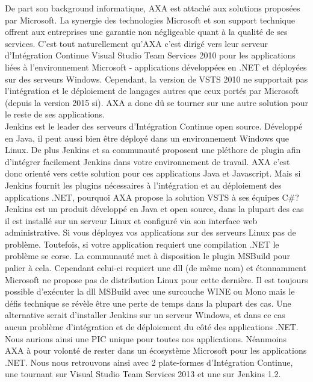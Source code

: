     De part son background informatique, AXA est attaché aux solutions proposées par Microsoft. La synergie des technologies Microsoft et son support technique offrent aux entreprises une garantie non négligeable quant à la qualité de ses services. C'est tout naturellement qu'AXA c'est dirigé vers leur serveur d'Intégration Continue Visual Studio Team Services 2010 pour les applications liées à l'environnement Microsoft - applications développées en .NET et déployées sur des serveurs Windows. Cependant, la version de VSTS 2010 ne supportait pas l'intégration et le déploiement de langages autres que ceux portés par Microsoft (depuis la version 2015 si). AXA a donc dû se tourner sur une autre solution pour le reste de ses applications.\\

    Jenkins est le leader des serveurs d'Intégration Continue open source. Développé en Java, il peut aussi bien être déployé dans un environnement Windows que Linux. De plus Jenkins et sa communauté proposent une pléthore de plugin afin d'intégrer facilement Jenkins dans votre environnement de travail. AXA c'est donc orienté vers cette solution pour ces applications Java et Javascript. Mais si Jenkins fournit les plugins nécessaires à l'intégration et au déploiement des applications .NET, pourquoi AXA propose la solution VSTS à ses équipes C\#?\\

    Jenkins est un produit développé en Java et open source, dans la plupart des cas il est installé sur un serveur Linux et configuré via son interface web administrative. Si vous déployez vos applications sur des serveurs Linux pas de problème. Toutefois, si votre application requiert une compilation .NET le problème se corse. La communauté met à disposition le plugin MSBuild pour palier à cela. Cependant celui-ci requiert une dll (de même nom) et étonnamment Microsoft ne propose pas de distribution Linux pour cette dernière. Il est toujours possible d'exécuter la dll MSBuild avec une surcouche WINE ou Mono mais le défis technique se révèle être une perte de temps dans la plupart des cas.
    Une alternative serait d'installer Jenkins sur un serveur Windows, et dans ce cas aucun problème d'intégration et de déploiement du côté des applications .NET. Nous aurions ainsi une PIC unique pour toutes nos applications. Néanmoins AXA à pour volonté de rester dans un écosystème Microsoft pour les applications .NET. Nous nous retrouvons ainsi avec 2 plate-formes d'Intégration Continue, une tournant sur Visual Studio Team Services 2013 et une sur Jenkins 1.2.\\

